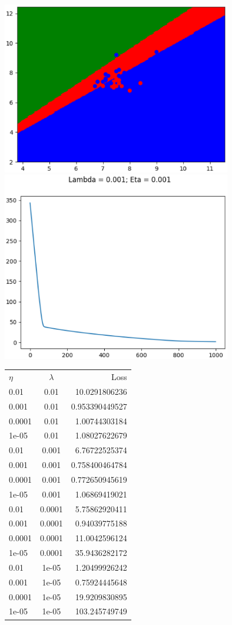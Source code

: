 \documentclass[submit]{harvardml}
\begin{document}
\begin{enumerate}
	\includegraphics[width = 0.75\textwidth]{logistic_regression_result.eps} 	\\
	\includegraphics[width = 0.75\textwidth]{Logistic_Regression_Loss.eps} 	\\
	
	\begin{tabular} {l | c | r} 
		$\eta$ & $\lambda$ & Loss  \\
		0.01 & 0.01 & 10.0291806236  \\ 
		0.001 & 0.01 & 0.953390449527  \\ 
		0.0001 & 0.01 & 1.00744303184   \\ 
		1e-05 & 0.01 & 1.08027622679  \\ 
		0.01 & 0.001 & 6.76722525374  \\ 
		0.001 & 0.001 & 0.758400464784  \\ 
		0.0001 & 0.001 & 0.772650945619  \\ 
		1e-05 & 0.001 & 1.06869419021  \\ 
		0.01 & 0.0001 & 5.75862920411  \\ 
		0.001 & 0.0001 & 0.94039775188   \\ 
		0.0001 & 0.0001 & 11.0042596124  \\ 
		1e-05 & 0.0001 & 35.9436282172  \\ 
		0.01 & 1e-05 & 1.20499926242  \\ 
		0.001 & 1e-05 & 0.75924445648  \\ 
		0.0001 & 1e-05 & 19.9209830895  \\ 
		1e-05 & 1e-05 & 103.245749749  \\ 
		
	\end{tabular}
\end{enumerate}
\end{document}
